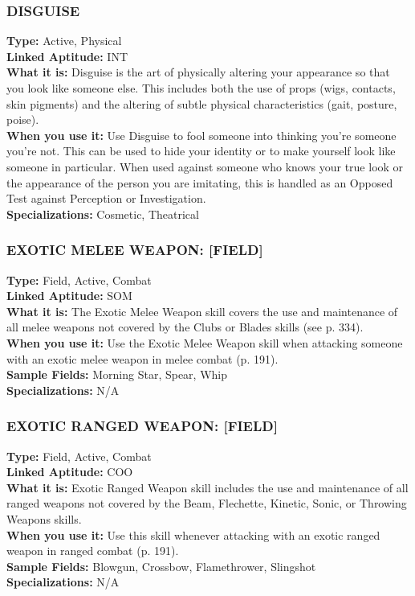 \subsubsection{DISGUISE}
\textbf{Type:} Active, Physical
\\ \textbf{Linked Aptitude:} INT
\\ \textbf{What it is:} Disguise is the art of physically altering
your appearance so that you look like someone else.
This includes both the use of props (wigs, contacts,
skin pigments) and the altering of subtle physical
characteristics (gait, posture, poise).
\\ \textbf{When you use it:} Use Disguise to fool someone into
thinking you’re someone you’re not. This can be used
to hide your identity or to make yourself look like
someone in particular. When used against someone
who knows your true look or the appearance of the
person you are imitating, this is handled as an Opposed Test against Perception or Investigation.
\\ \textbf{Specializations:} Cosmetic, Theatrical

\subsubsection{EXOTIC MELEE WEAPON: [FIELD]}
\textbf{Type:} Field, Active, Combat
\\ \textbf{Linked Aptitude:} SOM
\\ \textbf{What it is:} The Exotic Melee Weapon skill covers
the use and maintenance of all melee weapons not
covered by the Clubs or Blades skills (see p. 334).
\\ \textbf{When you use it:} Use the Exotic Melee Weapon skill
when attacking someone with an exotic melee weapon
in melee combat (p. 191).
\\ \textbf{Sample Fields:} Morning Star, Spear, Whip
\\ \textbf{Specializations:} N/A

\subsubsection{EXOTIC RANGED WEAPON: [FIELD]}
\textbf{Type:} Field, Active, Combat
\\ \textbf{Linked Aptitude:} COO
\\ \textbf{What it is:} Exotic Ranged Weapon skill includes
the use and maintenance of all ranged weapons not
covered by the Beam, Flechette, Kinetic, Sonic, or
Throwing Weapons skills.
\\ \textbf{When you use it:} Use this skill whenever attacking with
an exotic ranged weapon in ranged combat (p. 191).
\\ \textbf{Sample Fields:} Blowgun, Crossbow, Flamethrower,
Slingshot
\\ \textbf{Specializations:} N/A

